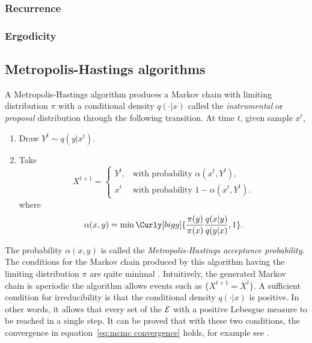 \subsubsection{Recurrence}
\label{ssub:Recurrence}

\subsubsection{Ergodicity}
\label{ssub:Ergodicity}

\subsection{Metropolis-Hastings algorithms}
\label{sub:Metropolis-Hastings algorithms}

A Metropolis-Hastings algorithm produces a Markov chain with limiting
distribution $\pi$ with a conditional density $q(\cdot|x)$ called the
\emph{instrumental} or \emph{proposal} distribution through the following
transition. At time $t$, given sample $x^t$,
\begin{enumerate}
  \item Draw $Y^t \sim q(y|x^t)$.
  \item Take
    \begin{equation*}
      X^{t+1} =
      \begin{cases}
        Y^t, &\text{with probability } \alpha(x^t,Y^t),\\
        x^t  &\text{with probability } 1 - \alpha(x^t,Y^t).
      \end{cases}
    \end{equation*}
    where
    \begin{equation}
      \alpha(x,y) =
      \min\Curly[bigg]{\frac{\pi(y)}{\pi(x)}\frac{q(x|y)}{q(y|x)},1}.
    \end{equation}
\end{enumerate}
The probability $\alpha(x,y)$ is called the \emph{Metropolis-Hastings
  acceptance probability}. The conditions for the Markov chain produced by
this algorithm having the limiting distribution $\pi$ are quite minimal
\cite[][sec.~7.3.2]{Robert:2004tn}. Intuitively, the generated Markov chain is
aperiodic the algorithm allows events such as $\{X^{t+1} = X^t\}$. A
sufficient condition for irreducibility is that the conditional density
$q(\cdot|x)$ is positive. In other words, it allows that every set of the
$\mathcal{E}$ with a positive Lebesgue measure to be reached in a single step. It
can be proved that with these two conditions, the convergence in
equation~\eqref{eq:mcmc convergence} holds, for example see
\cite[][Theorem~7.4 and Corollary~7.5]{Robert:2004tn}.

